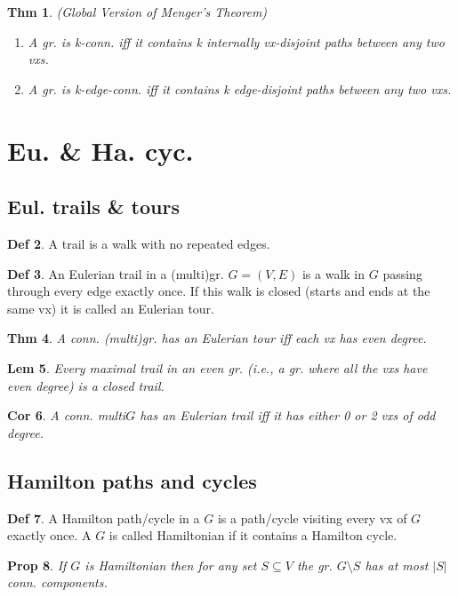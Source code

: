 \documentclass[11pt, fleqn, a4paper, landscape]{article}
\theoremstyle{plain} %
\newtheorem{thm}{Thm}
\newtheorem{lem}[thm]{Lem}
\newtheorem{pro}[thm]{Prop}
\newtheorem{cor}[thm]{Cor}
\theoremstyle{remark} %
\theoremstyle{definition} %
\newtheorem{defi}[thm]{Def}
\begin{document}
\begin{multicols}{5}
\begin{thm}
(Global Version of Menger’s Theorem)
\begin{enumerate}
\item A gr. is k-conn. iff it contains k internally vx-disjoint paths between any
two vxs.
\item A gr. is k-edge-conn. iff it contains k edge-disjoint paths between any two
vxs.
\end{enumerate}
\end{thm}

\section{Eu. \& Ha. cyc.}
\subsection{Eul. trails \& tours}
\addtocounter{thm}{1}
\begin{defi}
A trail is a walk with no repeated edges.
\end{defi}

\begin{defi}
An Eulerian trail in a (multi)gr. $G = (V,E)$ is a walk in $G$ passing through every edge exactly once. If this walk is closed (starts and ends at the same vx) it is called an Eulerian tour.
\end{defi}
\addtocounter{thm}{1}
\begin{thm}
A conn. (multi)gr. has an Eulerian tour iff each vx has even degree.
\end{thm}

\begin{lem}
Every maximal trail in an even gr. (i.e., a gr. where all the vxs have even degree) is a closed trail.
\end{lem} 

\begin{cor}
A conn. multi$G$ has an Eulerian trail iff it has either 0 or 2 vxs of odd degree.
\end{cor}

\subsection{Hamilton paths and cycles}
\begin{defi}
A Hamilton path/cycle in a $G$ is a path/cycle visiting every vx of $G$ exactly once. A $G$ is called Hamiltonian if it contains a Hamilton cycle.
\end{defi}
\addtocounter{thm}{1}
\begin{pro}
If $G$ is Hamiltonian then for any set $S \subseteq V$ the gr. $G\setminus S$ has at most $|S|$ conn. components.
\end{pro}


\end{multicols}
\end{document}
